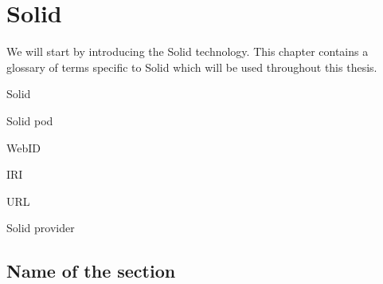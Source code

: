 \chapter{Solid}
We will start by introducing the Solid technology.
This chapter contains a glossary of terms specific to Solid which will be used throughout this thesis.

Solid

Solid pod

WebID

IRI

URL

Solid provider

\section{Name of the section}
